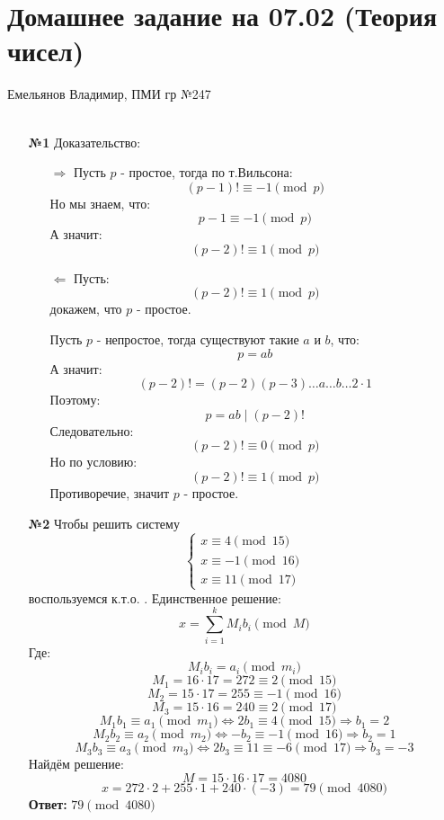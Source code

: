 \documentclass[a4paper]{article}
\newcommand{\s}[2]{\sum\limits_{#1}^{#2}}
\newcommand{\case}[1]{\begin{cases} #1 \end{cases}}
\newcommand{\lr}{\Leftrightarrow}
\renewcommand{\r}{\Rightarrow}
\newcommand{\divides}{\;|\;}
\begin{document}
\section*{Домашнее задание на 07.02 (Теория чисел)}
 {\large Емельянов Владимир, ПМИ гр №247}\\\\
\begin{enumerate}
    \item[\textbf{№1}]Доказательство:
    \begin{enumerate}
        \item[$\r$] Пусть $p$ - простое, тогда по т.Вильсона:
        $$(p-1)! \equiv -1 \pmod{p}$$
        Но мы знаем, что:
        $$p-1 \equiv -1 \pmod{p}$$
        А значит:
        $$(p-2)! \equiv 1 \pmod{p}$$

        \item[$\Leftarrow$] Пусть:
        $$(p-2)! \equiv 1 \pmod{p}$$
        докажем, что $p$ - простое.

        Пусть $p$ - непростое, тогда существуют такие $a$ и $b$, что:
        $$p = ab$$
        А значит:
        $$(p-2)! =(p-2)(p-3)\dots a \dots b \dots 2\cdot 1$$
        Поэтому:
        $$p=ab \divides (p-2)!$$
        Следовательно:
        $$(p-2)! \equiv 0 \pmod{p}$$
        Но по условию:
        $$(p-2)! \equiv 1 \pmod{p}$$
        Противоречие, значит $p$ - простое.
    \end{enumerate}

    \item[\textbf{№2}]Чтобы решить систему
    $$\case{
        x \equiv 4 \pmod{15}\\
        x \equiv -1 \pmod{16}\\
        x \equiv 11 \pmod{17}
    }$$
    воспользуемся к.т.о. . Единственное решение:
    $$x = \s{i=1}{k}M_i b_i \pmod{M}$$
    Где:
    $$M_i b_i = a_i \pmod{m_i}$$
    $$M_1 = 16\cdot 17 = 272 \equiv 2 \pmod{15}$$
    $$M_2 = 15\cdot 17 = 255 \equiv -1 \pmod{16}$$
    $$M_3 = 15\cdot 16 = 240 \equiv 2 \pmod{17}$$
    $$M_1b_1 \equiv a_1 \pmod{m_1} \lr 2 b_1 \equiv 4 \pmod{15} \r b_1 = 2$$
    $$M_2b_2 \equiv a_2 \pmod{m_2} \lr -b_2 \equiv -1 \pmod{16} \r b_2 = 1$$
    $$M_3b_3 \equiv a_3 \pmod{m_3} \lr 2b_3 \equiv 11 \equiv -6 \pmod{17} \r b_3 = -3$$
    Найдём решение:
    $$M = 15\cdot 16 \cdot 17 = 4080$$
    $$x = 272\cdot 2 +255 \cdot 1+240\cdot (-3) = 79 \pmod{4080}$$
    \textbf{Ответ: } $79 \pmod{4080}$\\


\end{enumerate}
\end{document}
